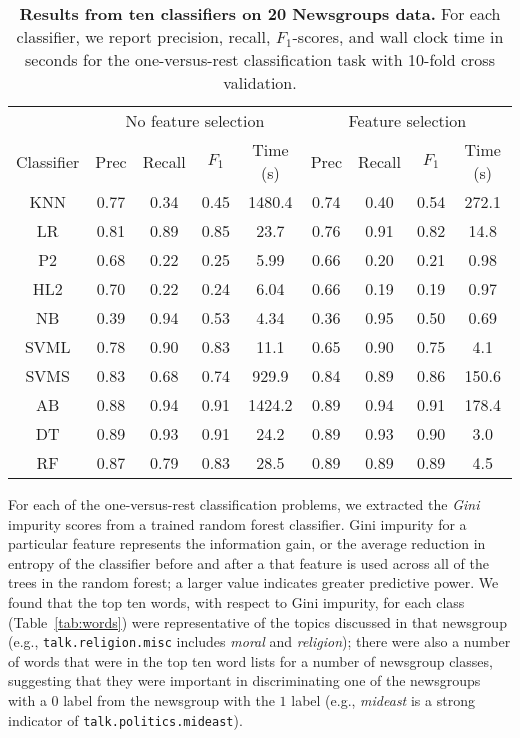 \documentclass{article} %
\begin{document}
\begin{table}[htbp]
\small
   \centering
   \begin{tabular}{@{}|c|c|c|c|c|c|c|c|c|@{}} %
   \hline
    &  \multicolumn{4}{c}{No feature selection} &
  \multicolumn{4}{c|}{Feature selection}  \\
  \cline{2-9}
   Classifier & Prec & Recall & $F_1$ & Time (s)& Prec & Recall & $F_1$ & Time (s) \\ \hline \hline
      KNN   &  0.77 & 0.34 & 0.45 & 1480.4 & 0.74 & 0.40 & 0.54 & 272.1\\
        LR   &  0.81 & 0.89 & 0.85 & 23.7& 0.76 & 0.91 & 0.82 & 14.8 \\
      P2      &  0.68 & 0.22 & 0.25 & 5.99& 0.66 & 0.20 & 0.21 & 0.98\\
      HL2    &  0.70 & 0.22 & 0.24 & 6.04& 0.66 & 0.19 & 0.19 & 0.97 \\
      NB &  0.39 & 0.94 & 0.53 & 4.34& 0.36 & 0.95 & 0.50 & 0.69  \\
      SVML &  0.78 & 0.90 & 0.83 & 11.1 & 0.65 & 0.90 & 0.75 & 4.1 \\
      SVMS &  0.83 & 0.68 & 0.74 & 929.9& 0.84 & 0.89 & 0.86 & 150.6 \\
      AB & 0.88 & 0.94 & 0.91 & 1424.2& 0.89 & 0.94 & 0.91 & 178.4 \\
      DT & 0.89 & 0.93 & 0.91 & 24.2& 0.89 & 0.93 & 0.90 & 3.0 \\
      RF &  0.87 & 0.79 & 0.83 & 28.5& 0.89 & 0.89 & 0.89 & 4.5 \\ \hline
   \end{tabular}
   \caption{{\bf Results from ten classifiers on 20 Newsgroups data.} For each classifier, we report precision, recall,  $F_1$-scores, and wall clock time in seconds for the one-versus-rest classification task with 10-fold cross validation.}
   \label{tab:classifiers}
\end{table}

For each of the one-versus-rest classification problems, we extracted the \emph{Gini} impurity scores from a trained random forest classifier. Gini impurity for a particular feature represents the information gain, or the average reduction in entropy of the classifier before and after a that feature is used across all of the trees in the random forest; a larger value indicates greater predictive power. We found that the top ten words, with respect to Gini impurity, for each class (Table~\ref{tab:words}) were representative of the topics discussed in that newsgroup (e.g., {\tt talk.religion.misc} includes \emph{moral} and \emph{religion}); there were also a number of words that were in the top ten word lists for a number of newsgroup classes, suggesting that they were important in discriminating one of the newsgroups with a $0$ label from the newsgroup with the $1$ label (e.g., \emph{mideast} is a strong indicator of {\tt talk.politics.mideast}).
\end{document}
